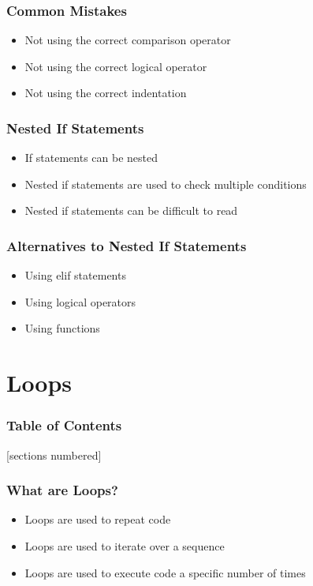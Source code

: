 \documentclass[serif, 9pt, aspectratio=32]{beamer}
\begin{document}
\begin{frame}
    \centering
    \frametitle{Common Mistakes}
    \begin{itemize}
        \setlength{\itemsep}{3em}
        \item Not using the correct comparison operator
        \item Not using the correct logical operator
        \item Not using the correct indentation
    \end{itemize}
\end{frame}

\begin{frame}
    \centering
    \frametitle{Nested If Statements}
    \begin{itemize}
        \setlength{\itemsep}{3em}
        \item If statements can be nested
        \item Nested if statements are used to check multiple conditions
        \item Nested if statements can be difficult to read
    \end{itemize}
\end{frame}

\begin{frame}
    \centering
    \frametitle{Alternatives to Nested If Statements}
    \begin{itemize}
        \setlength{\itemsep}{3em}
        \item Using elif statements
        \item Using logical operators
        \item Using functions
    \end{itemize}
\end{frame}

\section{Loops}

\begin{frame}
    \frametitle{Table of Contents}
    [sections numbered]
    \tableofcontents[currentsection]
\end{frame}

\begin{frame}
    \centering
    \frametitle{What are Loops?}
    \begin{itemize}
        \setlength{\itemsep}{3em}
        \item Loops are used to repeat code
        \item Loops are used to iterate over a sequence
        \item Loops are used to execute code a specific number of times
    \end{itemize}
\end{frame}
\end{document}
